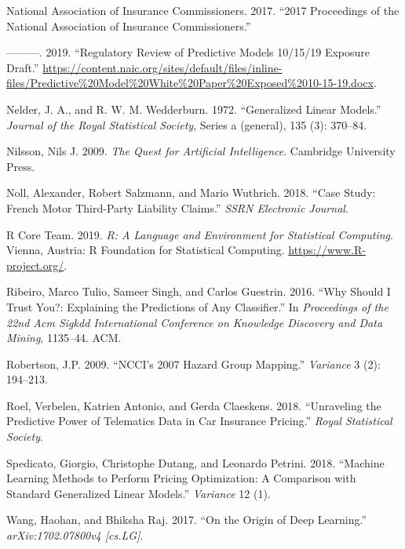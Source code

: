 \documentclass[preprint, 3p, twocolumn, letterpaper, 10pt]{elsarticle} %
\begin{document}
\leavevmode\hypertarget{ref-naic_summer_2017}{}%
National Association of Insurance Commissioners. 2017. ``2017 Proceedings of the National Association of Insurance Commissioners.''

\leavevmode\hypertarget{ref-naic_white_paper}{}%
---------. 2019. ``Regulatory Review of Predictive Models 10/15/19 Exposure Draft.'' \url{https://content.naic.org/sites/default/files/inline-files/Predictive\%20Model\%20White\%20Paper\%20Exposed\%2010-15-19.docx}.

\leavevmode\hypertarget{ref-nelder_wedderburn_1972}{}%
Nelder, J. A., and R. W. M. Wedderburn. 1972. ``Generalized Linear Models.'' \emph{Journal of the Royal Statistical Society}, Series a (general), 135 (3): 370--84.

\leavevmode\hypertarget{ref-nilsson_2009}{}%
Nilsson, Nils J. 2009. \emph{The Quest for Artificial Intelligence}. Cambridge University Press.

\leavevmode\hypertarget{ref-noll_2018}{}%
Noll, Alexander, Robert Salzmann, and Mario Wuthrich. 2018. ``Case Study: French Motor Third-Party Liability Claims.'' \emph{SSRN Electronic Journal}.

\leavevmode\hypertarget{ref-rlang}{}%
R Core Team. 2019. \emph{R: A Language and Environment for Statistical Computing}. Vienna, Austria: R Foundation for Statistical Computing. \url{https://www.R-project.org/}.

\leavevmode\hypertarget{ref-ribeiro2016should}{}%
Ribeiro, Marco Tulio, Sameer Singh, and Carlos Guestrin. 2016. ``Why Should I Trust You?: Explaining the Predictions of Any Classifier.'' In \emph{Proceedings of the 22nd Acm Sigkdd International Conference on Knowledge Discovery and Data Mining}, 1135--44. ACM.

\leavevmode\hypertarget{ref-robertson_2009}{}%
Robertson, J.P. 2009. ``NCCI's 2007 Hazard Group Mapping.'' \emph{Variance} 3 (2): 194--213.

\leavevmode\hypertarget{ref-roel_2018}{}%
Roel, Verbelen, Katrien Antonio, and Gerda Claeskens. 2018. ``Unraveling the Predictive Power of Telematics Data in Car Insurance Pricing.'' \emph{Royal Statistical Society}.

\leavevmode\hypertarget{ref-spedicato_2018}{}%
Spedicato, Giorgio, Christophe Dutang, and Leonardo Petrini. 2018. ``Machine Learning Methods to Perform Pricing Optimization: A Comparison with Standard Generalized Linear Models.'' \emph{Variance} 12 (1).

\leavevmode\hypertarget{ref-wang_raj_2017}{}%
Wang, Haohan, and Bhiksha Raj. 2017. ``On the Origin of Deep Learning.'' \emph{arXiv:1702.07800v4 {[}cs.LG{]}}.
\end{document}
